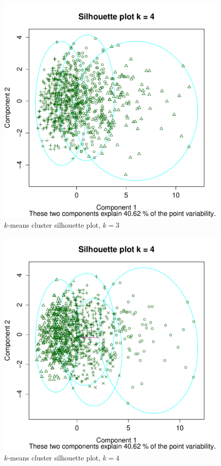 \documentclass[letterpaper,12pt]{article}
\begin{document}
\begin{figure}[h]
  \centering
  \includegraphics[width=\linewidth]{kmeans-silhouette-3.pdf}
  \caption{$k$-means cluster silhouette plot, $k = 3$}
  \label{fig:kmeans-silhouette-3}
\end{figure}

\begin{figure}[h]
  \centering
  \includegraphics[width=\linewidth]{kmeans-silhouette-4.pdf}
  \caption{$k$-means cluster silhouette plot, $k = 4$}
  \label{fig:kmeans-silhouette-4}
\end{figure}
\end{document}
